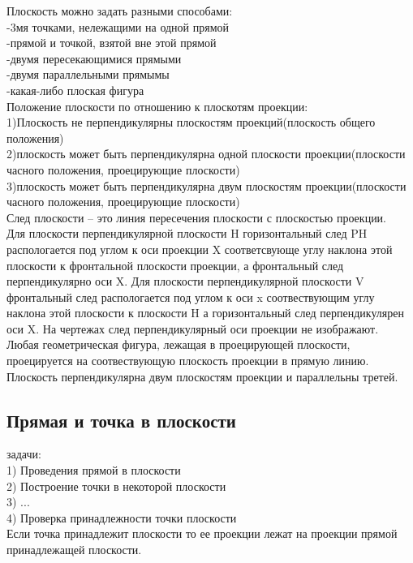 \documentclass[a4paper, 12pt]{article}
\begin{document}
Плоскость можно задать разными способами:\\
-3мя точками, нележащими на одной прямой\\
-прямой и точкой, взятой вне этой прямой\\
-двумя пересекающимися прямыми\\
-двумя параллельными прямымы\\
-какая-либо плоская фигура\\

Положение плоскости по отношению к плоскотям проекции:\\
1)Плоскость не перпендикулярны плоскостям проекций(плоскость общего положения)\\
2)плоскость может быть перпендикулярна одной плоскости проекции(плоскости часного положения, проецирующие плоскости)\\
3)плоскость может быть перпендикулярна двум плоскостям проекции(плоскости часного положения, проецирующие плоскости)\\

След плоскости -- это линия пересечения плоскости с плоскостью проекции.\\

Для плоскости перпендикулярной плоскости H горизонтальный след PH распологается под углом к оси проекции X соответсвующе углу наклона этой плоскости к фронтальной плоскости проекции, а фронтальный след перпендикулярно оси X. Для плоскости перпендикулярной плоскости V фронтальный след распологается под углом к оси x соотвествующим углу наклона этой плоскости к плоскости H а горизонтальный след перпендикулярен оси X. На чертежах след перпендикулярный оси проекции не изображают.\\

Любая геометрическая фигура, лежащая в проецирующей плоскости, проецируется на соотвествующую плоскость проекции в прямую линию.\\
Плоскость перпендикулярна двум плоскостям проекции и параллельны третей.\\

\subsection{Прямая и точка в плоскости}
задачи:\\
1) Проведения прямой в плоскости\\
2) Построение  точки в некоторой плоскости\\
3) ...\\
4) Проверка принадлежности точки плоскости\\

Если точка принадлежит плоскости то ее проекции лежат на проекции прямой принадлежащей плоскости.\\
\end{document}
